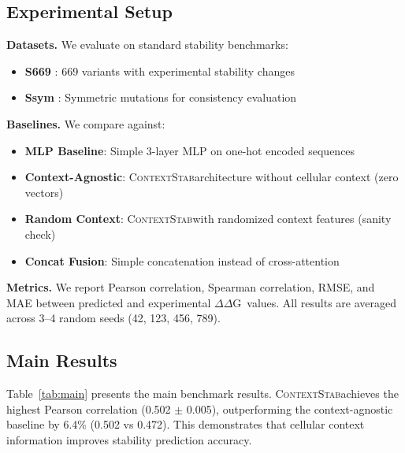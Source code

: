 \documentclass{article}
\newcommand{\ddg}{$\Delta\Delta$G}
\newcommand{\contextstab}{\textsc{ContextStab}}
\begin{document}
\subsection{Experimental Setup}

\textbf{Datasets.} We evaluate on standard stability benchmarks:
\begin{itemize}
    \item \textbf{S669} \citep{pakhrin2021ddgun}: 669 variants with experimental stability changes
    \item \textbf{Ssym} \citep{pucci2018deep}: Symmetric mutations for consistency evaluation
\end{itemize}

\textbf{Baselines.} We compare against:
\begin{itemize}
    \item \textbf{MLP Baseline}: Simple 3-layer MLP on one-hot encoded sequences
    \item \textbf{Context-Agnostic}: \contextstab architecture without cellular context (zero vectors)
    \item \textbf{Random Context}: \contextstab with randomized context features (sanity check)
    \item \textbf{Concat Fusion}: Simple concatenation instead of cross-attention
\end{itemize}

\textbf{Metrics.} We report Pearson correlation, Spearman correlation, RMSE, and MAE between predicted and experimental \ddg\ values. All results are averaged across 3--4 random seeds (42, 123, 456, 789).

\subsection{Main Results}

Table~\ref{tab:main} presents the main benchmark results. \contextstab achieves the highest Pearson correlation (0.502 $\pm$ 0.005), outperforming the context-agnostic baseline by 6.4\% (0.502 vs 0.472). This demonstrates that cellular context information improves stability prediction accuracy.
\end{document}
